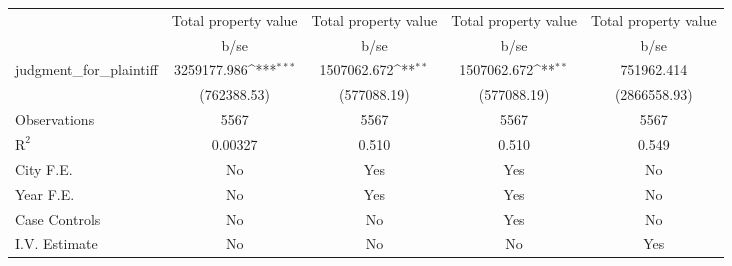{
\def\sym#1{\ifmmode^{#1}\else\(^{#1}\)\fi}
\begin{tabular}{l*{4}{c}}
\toprule
                    &\multicolumn{1}{c}{\hspace{0.25cm}Total property value}&\multicolumn{1}{c}{\hspace{0.25cm}Total property value}&\multicolumn{1}{c}{\hspace{0.25cm}Total property value}&\multicolumn{1}{c}{\hspace{0.25cm}Total property value}\\
                    &        b/se         &        b/se         &        b/se         &        b/se         \\
\midrule
judgment\_for\_plaintiff& 3259177.986\sym{***}& 1507062.672\sym{**} & 1507062.672\sym{**} &  751962.414         \\
                    & (762388.53)         & (577088.19)         & (577088.19)         &(2866558.93)         \\
\midrule
Observations        &        5567         &        5567         &        5567         &        5567         \\
$\text{R}^2$        &     0.00327         &       0.510         &       0.510         &       0.549         \\
City F.E.           &          No         &         Yes         &         Yes         &          No         \\
Year F.E.           &          No         &         Yes         &         Yes         &          No         \\
Case Controls       &          No         &          No         &         Yes         &          No         \\
I.V. Estimate       &          No         &          No         &          No         &         Yes         \\
\bottomrule
\end{tabular}
}
